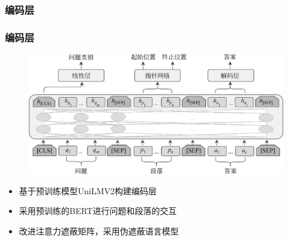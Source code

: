 \documentclass{beamer}
\begin{document}
\subsubsection{编码层}
\begin{frame}
    \frametitle{编码层}

    \begin{figure}
        \centering
        \includegraphics{./fig/model.jpg}
    \end{figure}

    \begin{itemize}
        \item 基于预训练模型UniLMV2构建编码层
        \item 采用预训练的BERT进行问题和段落的交互
        \item 改进注意力遮蔽矩阵，采用伪遮蔽语言模型
    \end{itemize}

\end{frame}
\end{document}
